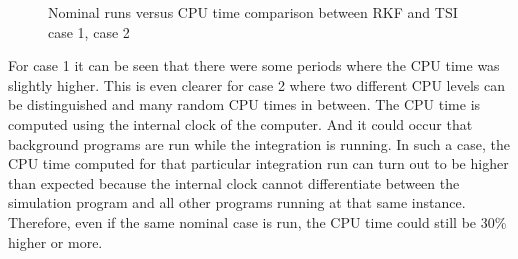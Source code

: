 \begin{figure}[H]
\centering
{} 
\caption{Nominal runs versus CPU time comparison between \ac{RKF} and \ac{TSI} \protect{} case 1,  \protect{} case 2 } 
\label{fig:multiRunVsCPUcase1RKFTSIsmall} 
\end{figure} 

\noindent
For case 1 it can be seen that there were some periods where the CPU time was slightly higher. This is even clearer for case 2 where two different CPU levels can be distinguished and many random CPU times in between. The CPU time is computed using the internal clock of the computer. And it could occur that background programs are run while the integration is running. In such a case, the CPU time computed for that particular integration run can turn out to be higher than expected because the internal clock cannot differentiate between the simulation program and all other programs running at that same instance. Therefore, even if the same nominal case is run, the CPU time could still be 30\% higher or more. 

